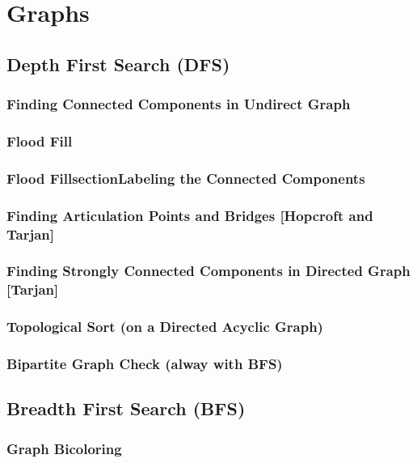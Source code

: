 \chapter{Graphs}
\section {Depth First Search (DFS)}
	
	\subsection {Finding Connected Components in Undirect Graph}
		
	\subsection {Flood Fill}
		
	\subsection {Flood FillsectionLabeling the Connected Components}
	\subsection {Finding Articulation Points and Bridges [Hopcroft and Tarjan]}
		
	\subsection {Finding Strongly Connected Components in Directed Graph [Tarjan]}
		
	\subsection {Topological Sort (on a Directed Acyclic Graph)}
	\subsection {Bipartite Graph Check (alway with BFS)}
\section {Breadth First Search (BFS)}
	
	\subsection {Graph Bicoloring}
	  
